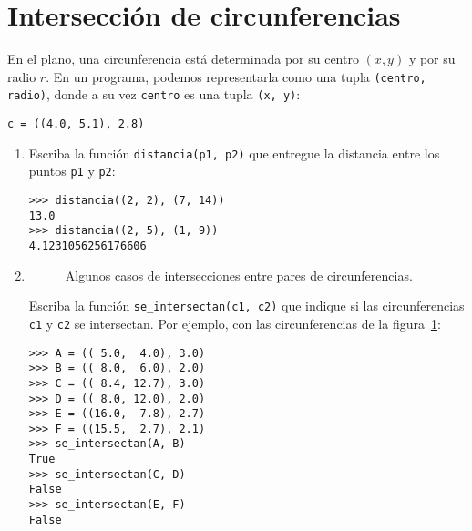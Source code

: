 \section{Intersección de circunferencias}

En el plano, una circunferencia está determinada por su centro
\((x, y)\) y por su radio \(r\).
En un programa, podemos representarla como una tupla
\lstinline!(centro, radio)!, donde a su vez \lstinline!centro! es una
tupla \lstinline!(x, y)!:
\begin{lstlisting}
c = ((4.0, 5.1), 2.8)
\end{lstlisting}

\begin{enumerate}

  \item
    Escriba la función \lstinline!distancia(p1, p2)! que entregue la
    distancia entre los puntos \lstinline!p1! y \lstinline!p2!:
\begin{lstlisting}
>>> distancia((2, 2), (7, 14))
13.0
>>> distancia((2, 5), (1, 9))
4.1231056256176606
\end{lstlisting}

  \item

    \begin{figure}
      \centering
      
      \label{fig:circunferencias}
      \caption{Algunos casos de intersecciones
        entre pares de circunferencias.}
    \end{figure}

    Escriba la función \lstinline!se_intersectan(c1, c2)! que indique si
    las circunferencias \lstinline!c1! y \lstinline!c2! se intersectan.
    Por ejemplo,
    con las circunferencias de la figura~\ref{fig:circunferencias}:
\begin{lstlisting}
>>> A = (( 5.0,  4.0), 3.0)
>>> B = (( 8.0,  6.0), 2.0)
>>> C = (( 8.4, 12.7), 3.0)
>>> D = (( 8.0, 12.0), 2.0)
>>> E = ((16.0,  7.8), 2.7)
>>> F = ((15.5,  2.7), 2.1)
>>> se_intersectan(A, B)
True
>>> se_intersectan(C, D)
False
>>> se_intersectan(E, F)
False
\end{lstlisting}
\end{enumerate}
